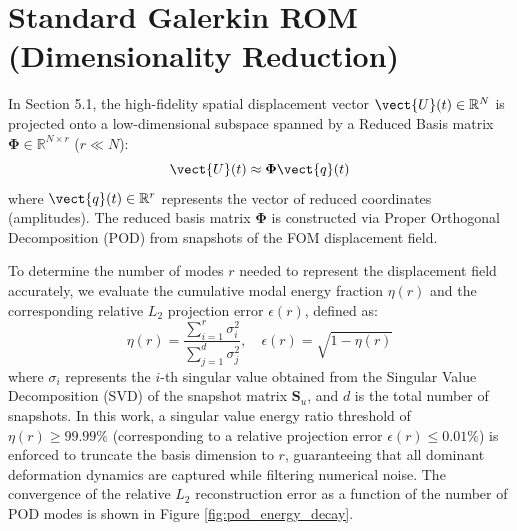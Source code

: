 \section{Standard Galerkin ROM (Dimensionality Reduction)} \label{sec:galerkin_rom}
In Section 5.1, the high-fidelity spatial displacement vector $\vect{U}(t) \in \mathbb{R}^N$ is projected onto a low-dimensional subspace spanned by a Reduced Basis matrix $\boldsymbol{\Phi} \in \mathbb{R}^{N \times r}$ ($r \ll N$):
\begin{equation}
    \vect{U}(t) \approx \boldsymbol{\Phi} \vect{q}(t)
\end{equation}
where $\vect{q}(t) \in \mathbb{R}^r$ represents the vector of reduced coordinates (amplitudes). The reduced basis matrix $\boldsymbol{\Phi}$ is constructed via Proper Orthogonal Decomposition (POD) from snapshots of the FOM displacement field. 

To determine the number of modes $r$ needed to represent the displacement field accurately, we evaluate the cumulative modal energy fraction $\eta(r)$ and the corresponding relative $L_2$ projection error $\epsilon(r)$, defined as:
\begin{equation}
    \eta(r) = \frac{\sum_{i=1}^{r} \sigma_i^2}{\sum_{j=1}^{d} \sigma_j^2}, \quad \epsilon(r) = \sqrt{1 - \eta(r)}
\end{equation}
where $\sigma_i$ represents the $i$-th singular value obtained from the Singular Value Decomposition (SVD) of the snapshot matrix $\mathbf{S}_u$, and $d$ is the total number of snapshots. In this work, a singular value energy ratio threshold of $\eta(r) \ge 99.99\%$ (corresponding to a relative projection error $\epsilon(r) \le 0.01\%$) is enforced to truncate the basis dimension to $r$, guaranteeing that all dominant deformation dynamics are captured while filtering numerical noise. The convergence of the relative $L_2$ reconstruction error as a function of the number of POD modes is shown in Figure \ref{fig:pod_energy_decay}.

